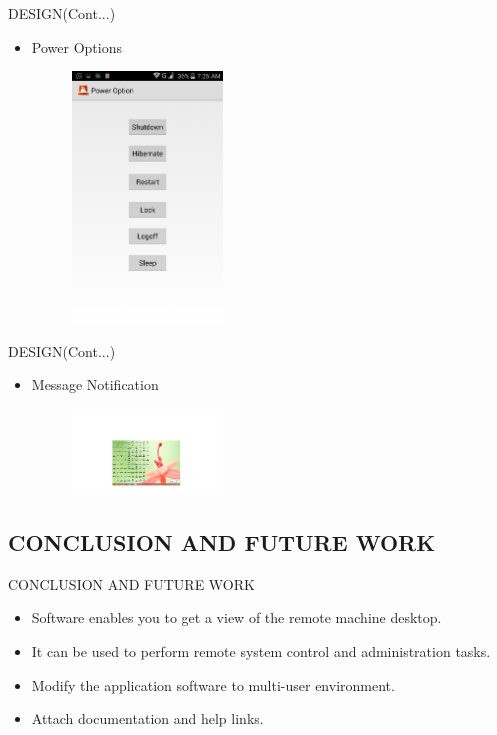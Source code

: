 \begin{frame}{DESIGN(Cont...)}  
   \begin{itemize}
  	\item Power Options
 	 \begin{figure}[ht!]
     \centering
    \includegraphics[width=4cm]{power.png}
    \label{fig:pc control desktop}
\end{figure}
   \end{itemize}
 \end{frame} 
 
\begin{frame}{DESIGN(Cont...)}  
   \begin{itemize}
  	\item Message Notification
 	 \begin{figure}[ht!]
     \centering
    \includegraphics[width=4cm]{notify.png}
    \label{fig:pc control desktop}
\end{figure}
   \end{itemize}
 \end{frame} 
 


 \subsection{CONCLUSION AND FUTURE WORK}
\begin{frame}{CONCLUSION AND FUTURE WORK}
\begin{itemize}
\item Software enables you to get a view of the remote machine desktop.
\item It can be used to perform remote system control and administration tasks.
\item Modify the application software to multi-user environment.
\item Attach documentation and help links.
\end{itemize}

\end{frame}

